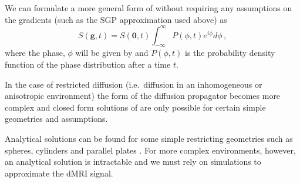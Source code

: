 We can formulate a more general form of   without requiring any assumptions on the gradients (such as the \ac{SGP} approximation used above) as \cite{Price1997,Hall2009}
\begin{equation}
  S(\mathbf{g}, t) = S(\mathbf{0}, t) \int_{-\infty}^{\infty} P(\phi, t) e^{i\phi} d\phi\,,
  \label{eq:sig_phi_complex}
\end{equation}
where the phase, $\phi$ will be given by  and $P(\phi, t)$ is the probability density function of the phase distribution after a time $t$.

In the case of restricted diffusion (i.e.\ diffusion in an inhomogeneous or anisotropic environment) the form of the diffusion propagator becomes more complex and closed form solutions of  are only possible for certain simple geometries and assumptions.

Analytical solutions can be found for some simple restricting geometries such as spheres, cylinders and parallel plates \cite{Neuman1974, Balinov1993,Callaghan1995}.
For more complex environments, however, an analytical solution is intractable and we must rely on simulations to approximate the \acl{dMRI} signal.  

